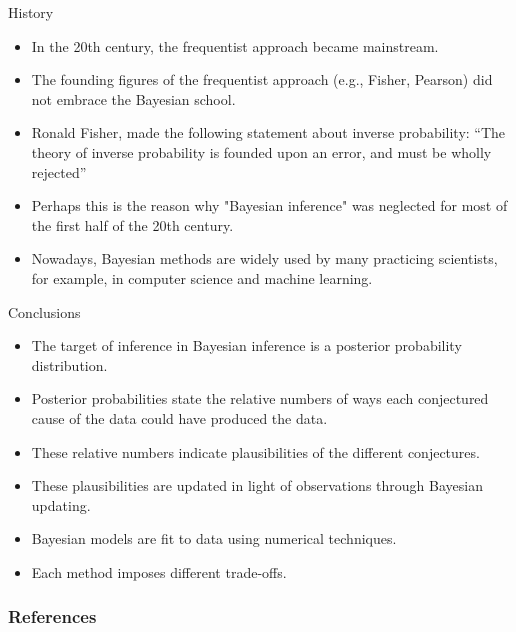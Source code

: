 \documentclass[handout]{beamer}
\begin{document}
\begin{frame}{History}
\scriptsize{

\begin{itemize}

\item In the 20th century, the frequentist approach became mainstream.

\item The founding figures of the frequentist approach (e.g., Fisher, Pearson) did not embrace the Bayesian school.

\item Ronald Fisher, made the following statement about inverse probability: ``The theory of inverse probability is founded upon an error, and must be wholly rejected'' \cite{fisher1992statistical}

\item Perhaps this is the reason why "Bayesian inference" was neglected for most of the first half of the 20th century.

\item Nowadays, Bayesian methods are widely used by many practicing scientists, for example, in computer science and machine learning.

\end{itemize}


} 
\end{frame}

\begin{frame}{Conclusions}
\scriptsize{

\begin{itemize}
\item The target of inference in Bayesian inference is a posterior probability distribution.\item Posterior probabilities state the relative numbers of ways each conjectured cause of the data could have produced the data. 
\item These relative numbers indicate plausibilities of the different conjectures.
\item These plausibilities are updated in light of observations through Bayesian updating.
\item Bayesian models are fit to data using numerical techniques.
\item Each method imposes different trade-offs.

\end{itemize}


} 
\end{frame}


\begin{frame}[allowframebreaks]\scriptsize
\frametitle{References}


%
\end{frame}  









\end{document}
